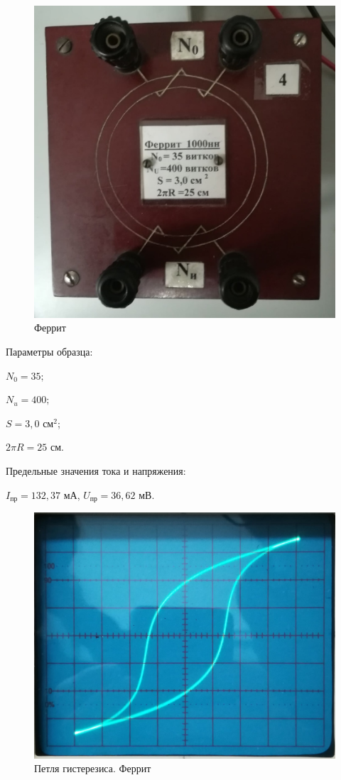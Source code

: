 \documentclass[a4paper,12pt]{article} %
\begin{document}
\begin{figure}[h!]
	\centering
	\includegraphics[scale=0.47]{Pictures/ФЕРРИТ.jpg}
	\caption{Феррит}
\end{figure}

Параметры образца:

$N_0 = 35;$

$N_u = 400;$

$S = 3,0$ см$^2$;

$2\pi R = 25$ см.

\vspace{7mm}
Предельные значения тока и напряжения:

$I_{\text{пр}} = 132,37$ мА, $U_{\text{пр}} = 36,62$ мВ.

\begin{figure}[h!]
	\centering
	\includegraphics[scale=0.27]{Pictures/ФЕРРИТ_ПЕТЛЯ.jpg}
	\caption{Петля гистерезиса. Феррит}
\end{figure}
\end{document}
